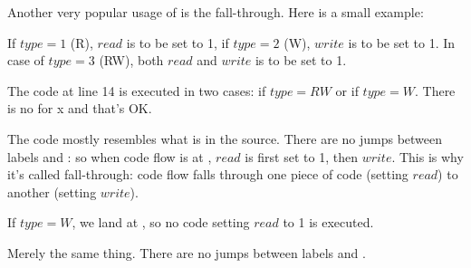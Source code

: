 ﻿

Another very popular usage of  is the fall-through.
Here is a small example:



If $type=1$ (R), $read$ is to be set to 1, if $type=2$ (W), $write$ is to be set to 1.
In case of $type=3$ (RW), both $read$ and $write$ is to be set to 1.

The code at line 14 is executed in two cases: if $type=RW$ or if $type=W$.
There is no  for x and that's OK.




The code mostly resembles what is in the source.
There are no jumps between labels  and : so when code flow is at 
, $read$ is first set to 1, then $write$.
This is why it's called fall-through: code flow falls through one piece of code
(setting $read$) to another (setting $write$).

If $type=W$, we land at , so no code setting $read$ to 1 is executed.




Merely the same thing.
There are no jumps between labels  and .

